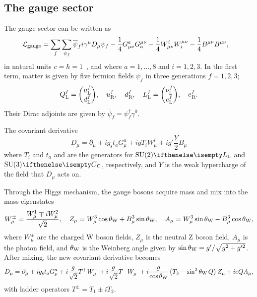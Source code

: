 \subsection{The gauge sector} \label{sec:gauge}
The gauge sector can be written as
\begin{align} \label{eq:gauge}
  \Lg{gauge} &= \sum_f \sum_{\psi_f} \overline{\psi}_f i\gamma^\mu D_\mu \psi_f %
              -\frac{1}{4} G^a_{\mu\nu}G_a^{\mu\nu}
              -\frac{1}{4} W^i_{\mu\nu}W_i^{\mu\nu}
              -\frac{1}{4} B^{\mu\nu}B^{\mu\nu},
\end{align}
in natural units $c=\hbar=1$~\cite{flavor_lecture_Isidori_UZH}, and where $a=1,...,8$ and $i=1,2,3$.
In the first term, matter is given by five fermion fields $\psi_f$ in three generations $f=1,2,3$;
\begin{equation} \label{eq:matter}
  \ff{Q}{L}^f = \db{\ff{u^f}{L}}{\ff{d^f}{L}},\quad
  \ff{u}{R}^f,\quad
  \ff{d}{R}^f,\quad
  \ff{L}{L}^f = \db{\ff{\nu^f}{L}}{\ff{e^f}{L}},\quad
  \ff{e}{R}^f.
\end{equation}
Their Dirac adjoints are given by $\overline{\psi}_f = \psi_f^\dagger\gamma^0$.




The covariant derivative
\begin{equation}
  D_\mu = \partial_\mu
          + ig_\mathrm{s}t_aG^a_\mu
          + igT_iW^i_\mu
          + ig'\frac{Y}{2}B_\mu
\end{equation}
where $T_i$ and $t_a$ and are the generators for $\SU[L]{2}$ and $\SU[C]{3}$, respectively, and $Y$ is the weak hypercharge of the field that $D_\mu$ acts on.

Through the Higgs mechanism, the gauge bosons acquire mass and mix into the mass eigenstates
\begin{equation}
  W^\pm_\mu = \frac{W^1_\mu \mp iW^2_\mu}{\sqrt{2}},\quad
  Z_\mu = W^3_\mu\cos{\ensuremath{\theta_\mathrm{W}}} + B^3_\mu\sin{\ensuremath{\theta_\mathrm{W}}},\quad
  A_\mu = W^3_\mu\sin{\ensuremath{\theta_\mathrm{W}}} - B^3_\mu\cos{\ensuremath{\theta_\mathrm{W}}},
\end{equation}
where $W^\pm_\mu$ are the charged W boson fields,
$Z_\mu$ is the neutral Z boson field,
$A_\mu$ is the photon field,
and ${\theta_\mathrm{W}}$ is the Weinberg angle given by $\sin{\ensuremath{\theta_\mathrm{W}}} = g'/\sqrt{g^2+g'^2}$.
After mixing, the new covariant derivative becomes
\begin{equation} \label{eq:D_mu_broken}
  D_\mu = \partial_\mu
          + ig_\mathrm{s}t_aG^a_\mu
          + i\frac{g}{\sqrt{2}}T^+W^+_\mu
          + i\frac{g}{\sqrt{2}}T^-W^-_\mu
          + i\frac{g}{\cos{\ensuremath{\theta_\mathrm{W}}}}\left( T_3 - \sin^2{{\theta_\mathrm{W}}}\, Q \right)Z_\mu
          + ieQA_\mu,
\end{equation}
with ladder operators $T^\pm = T_1 \pm iT_2$.


